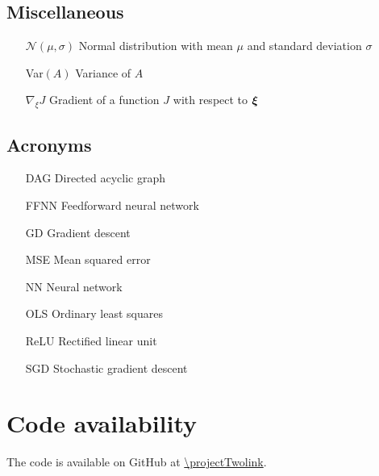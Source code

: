 \subsection*{Miscellaneous}
\begin{enumerate}[leftmargin=4.1em]
    \item[$\mathcal{N}(\mu, \sigma)$]  Normal distribution with mean $\mu$ and standard deviation $\sigma$
    \item[Var$(A)$] Variance of $A$ %
    \item[$\nabla_{\!\xi} J$] Gradient of a function $J$ with respect to $\boldsymbol{\xi}$
\end{enumerate}

\subsection*{Acronyms}
\begin{enumerate}[leftmargin=3.3em]
    \item[DAG] Directed acyclic graph
    \item[FFNN] Feedforward neural network
    \item[GD] Gradient descent
    \item[MSE] Mean squared error 
    \item[NN] Neural network 
    \item[OLS] Ordinary least squares 
    \item[ReLU] Rectified linear unit
    \item[SGD] Stochastic gradient descent 
\end{enumerate}








\section*{Code availability}
The code is available on GitHub at \url{\projectTwolink}.







